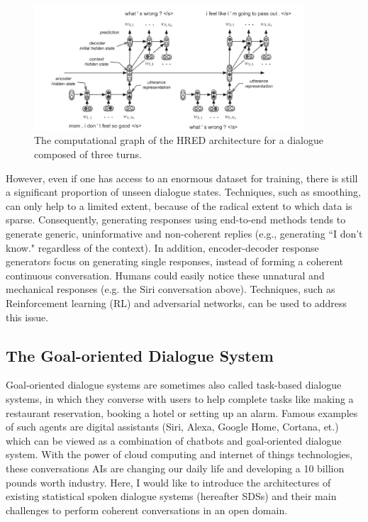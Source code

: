 \documentclass[bsc,frontabs,twoside,singlespacing,parskip,deptreport]{infthesis}     %
\begin{document}
\begin{figure}[h]
    \centering
    \includegraphics[width=0.9\textwidth]{HERD.jpeg}
    \caption{The computational graph of the HRED architecture for a dialogue composed of three turns.}
    \label{fig:HERD}
\end{figure}

However, even if one has access to an enormous dataset for training, there is still a significant proportion of unseen dialogue states. Techniques, such as smoothing, can only help to a limited extent, because of the radical extent to which data is sparse. Consequently, generating responses using end-to-end methods tends to generate generic, uninformative and non-coherent replies (e.g., generating ``I don’t know." regardless of the context). In addition, encoder-decoder response generators focus on generating single responses, instead of forming a coherent continuous conversation\cite{jurafsky2019speech}. Humans could easily notice these unnatural and mechanical responses (e.g. the Siri conversation above). Techniques, such as Reinforcement learning (RL)\cite{li2016deep} and adversarial networks\cite{li2017adversarial}, can be used to address this issue.

\subsection{The Goal-oriented Dialogue System}

 Goal-oriented dialogue systems are sometimes also called task-based dialogue systems, in which they converse with users to help complete tasks like making a restaurant reservation, booking a hotel or setting up an alarm. Famous examples of such agents are digital assistants (Siri, Alexa, Google Home, Cortana, et.) which can be viewed as a combination of chatbots and goal-oriented dialogue system. With the power of cloud computing and internet of things technologies, these conversations AIs are changing our daily life and developing a 10 billion pounds worth industry. Here, I would like to introduce the architectures of existing statistical spoken dialogue systems (hereafter SDSs) and their main challenges to perform coherent conversations in an open domain. 
\end{document}
